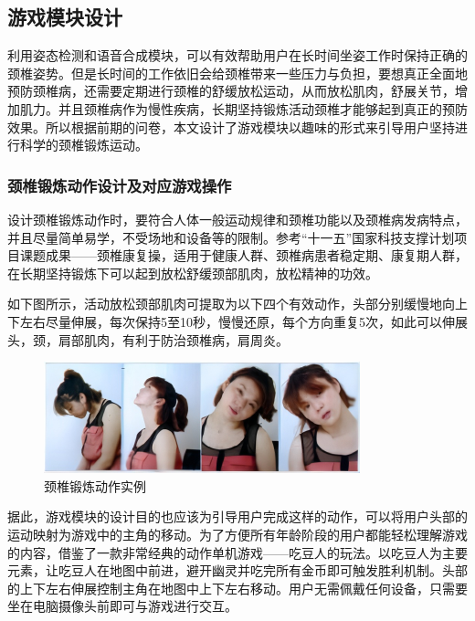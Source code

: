\documentclass[12pt,a4paper]{article}%
\begin{document}
\subsection{游戏模块设计}
利用姿态检测和语音合成模块，可以有效帮助用户在长时间坐姿工作时保持正确的颈椎姿势。但是长时间的工作依旧会给颈椎带来一些压力与负担，要想真正全面地预防颈椎病，还需要定期进行颈椎的舒缓放松运动，从而放松肌肉，舒展关节，增加肌力。并且颈椎病作为慢性疾病，长期坚持锻炼活动颈椎才能够起到真正的预防效果。所以根据前期的问卷，本文设计了游戏模块以趣味的形式来引导用户坚持进行科学的颈椎锻炼运动。
\subsubsection{颈椎锻炼动作设计及对应游戏操作}
设计颈椎锻炼动作时，要符合人体一般运动规律和颈椎功能以及颈椎病发病特点，并且尽量简单易学，不受场地和设备等的限制。参考“十一五”国家科技支撑计划项目课题成果——颈椎康复操\cite{朱立国2015颈椎康复操}，适用于健康人群、颈椎病患者稳定期、康复期人群，在长期坚持锻炼下可以起到放松舒缓颈部肌肉，放松精神的功效。

如下图所示，活动放松颈部肌肉可提取为以下四个有效动作，头部分别缓慢地向上下左右尽量伸展，每次保持5至10秒，慢慢还原，每个方向重复5次，如此可以伸展头，颈，肩部肌肉，有利于防治颈椎病，肩周炎。

\begin{figure}[H]
\centering
\includegraphics[width=.7\textwidth]{./Part3-Design.pic/exercise.png}
\caption{颈椎锻炼动作实例}
\end{figure}

据此，游戏模块的设计目的也应该为引导用户完成这样的动作，可以将用户头部的运动映射为游戏中的主角的移动。为了方便所有年龄阶段的用户都能轻松理解游戏的内容，借鉴了一款非常经典的动作单机游戏——吃豆人的玩法。以吃豆人为主要元素，让吃豆人在地图中前进，避开幽灵并吃完所有金币即可触发胜利机制。头部的上下左右伸展控制主角在地图中上下左右移动。用户无需佩戴任何设备，只需要坐在电脑摄像头前即可与游戏进行交互。
\end{document}
